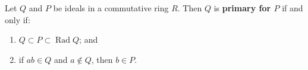 Let $Q$ and $P$ be ideals in a commutative ring $R$. Then $Q$ is \textbf{primary for $P$} if and only if:
\begin{enumerate}
  \item $Q \subset P \subset \operatorname{Rad} Q$; and
  \item if $ab \in Q$ and $a \notin Q$, then $b \in P$.
\end{enumerate}
